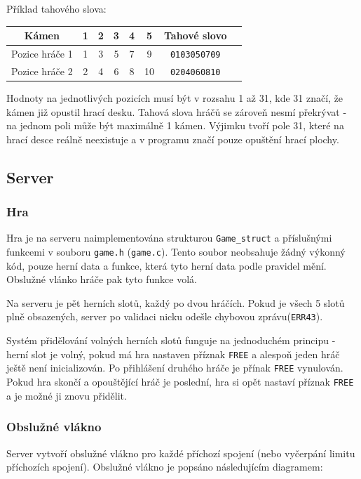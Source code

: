 \documentclass[11pt,a4paper]{scrartcl}
\begin{document}
	Příklad tahového slova:
	
	\begin{center}
		\begin{tabular} {| c || c | c | c | c | c | c | c}
			\hline
			Kámen & 1 & 2 & 3 & 4 & 5 & Tahové slovo\\
			\hline
			\hline
			Pozice hráče 1 & 1& 3& 5& 7& 9 & \verb|0103050709|\\
			\hline
			\hline
			Pozice hráče 2 & 2& 4& 6& 8& 10& \verb|0204060810|\\
						
			\hline
		\end{tabular}
	
	\end{center}
	
	Hodnoty na jednotlivých pozicích musí být v rozsahu 1 až 31, kde 31 značí, že kámen již opustil hrací desku. Tahová slova hráčů se zároveň nesmí překrývat - na jednom poli může být maximálně 1 kámen. Výjimku tvoří pole 31, které na hrací desce reálně neexistuje a v programu značí pouze opuštění hrací plochy.
	
		
	\subsection{Server}
	
	
	\subsubsection{Hra}
	
	Hra je na serveru naimplementována strukturou \verb|Game_struct| a příslušnými funkcemi v souboru \verb|game.h| (\verb|game.c|). Tento soubor neobsahuje žádný výkonný kód, pouze herní data a funkce, která tyto herní data podle pravidel mění. Obslužné vlánko hráče pak tyto funkce volá.
	
	Na serveru je pět herních slotů, každý po dvou hráčích. Pokud je všech 5 slotů plně obsazených, server po validaci nicku odešle chybovou zprávu(\verb|ERR43|).
	
	Systém přidělování volných herních slotů funguje na jednoduchém principu - herní slot je volný, pokud má hra nastaven příznak \verb|FREE| a alespoň jeden hráč ještě není inicializován. Po přihlášení druhého hráče je přínak \verb|FREE| vynulován. Pokud hra skončí a opouštějící hráč je poslední, hra si opět nastaví příznak \verb|FREE| a je možné ji znovu přidělit.
	
	\subsubsection{Obslužné vlákno}
	Server vytvoří obslužné vlákno pro každé příchozí spojení (nebo vyčerpání limitu příchozích spojení). Obslužné vlákno je popsáno následujícím diagramem:
	
\end{document}
